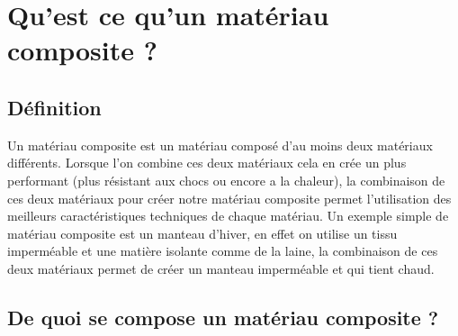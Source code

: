 

\chapter{Qu'est ce qu'un matériau composite ?}


\section{Définition}
Un matériau composite est un matériau composé d’au moins deux matériaux différents. Lorsque l’on combine ces deux matériaux cela en crée un plus performant (plus résistant aux chocs ou encore a la chaleur), la combinaison de ces deux matériaux pour créer notre matériau composite permet l’utilisation des meilleurs caractéristiques techniques de chaque matériau. Un exemple simple de matériau composite est un manteau d’hiver, en effet on utilise un tissu imperméable et une matière isolante comme de la laine, la combinaison de ces deux matériaux permet de créer un manteau imperméable et qui tient chaud.


\section{De quoi se compose un matériau composite ?}

